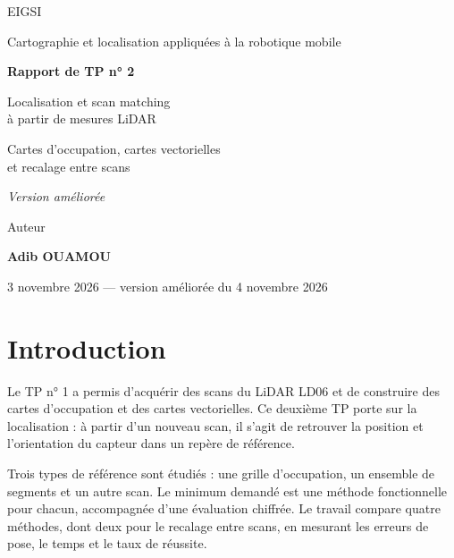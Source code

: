 \documentclass[11pt,a4paper]{article}
\begin{document}
\begin{titlepage}
\centering
\vspace*{1.8cm}
{\Large EIGSI\par}
\vspace{0.5cm}
{\large Cartographie et localisation appliquées à la robotique mobile\par}
\vspace{2cm}
{\Huge\bfseries Rapport de TP n° 2\par}
\vspace{0.7cm}
{\LARGE Localisation et scan matching\\à partir de mesures LiDAR\par}
\vspace{0.9cm}
{\large Cartes d'occupation, cartes vectorielles\\et recalage entre scans\par}
\vspace{0.6cm}
{\large\itshape Version améliorée\par}
\vfill
{\large Auteur\par}
\vspace{0.2cm}
{\LARGE\bfseries Adib OUAMOU\par}
\vspace{1cm}
{\large 3 novembre 2026 --- version améliorée du 4 novembre 2026\par}
\vspace{1cm}
\end{titlepage}

\begingroup
\setlength{\parskip}{0pt}
\tableofcontents
\endgroup
\newpage
{}

\section*{Introduction}
Le TP n° 1 a permis d'acquérir des scans du LiDAR LD06 et de construire
des cartes d'occupation et des cartes vectorielles. Ce deuxième TP porte
sur la localisation : à partir d'un nouveau scan, il s'agit de retrouver
la position et l'orientation du capteur dans un repère de référence.

Trois types de référence sont étudiés : une grille d'occupation, un ensemble
de segments et un autre scan. Le minimum demandé est une méthode
fonctionnelle pour chacun, accompagnée d'une évaluation chiffrée.
Le travail compare quatre méthodes, dont deux pour le recalage entre scans,
en mesurant les erreurs de pose, le temps et le taux de réussite.
\end{document}
